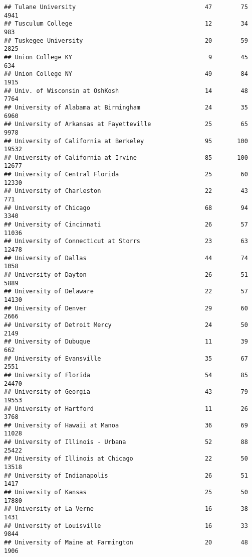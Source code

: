 \documentclass[
]{article}
\begin{document}
\begin{verbatim}
## Tulane University                                    47        75        4941
## Tusculum College                                     12        34         983
## Tuskegee University                                  20        59        2825
## Union College KY                                      9        45         634
## Union College NY                                     49        84        1915
## Univ. of Wisconsin at OshKosh                        14        48        7764
## University of Alabama at Birmingham                  24        35        6960
## University of Arkansas at Fayetteville               25        65        9978
## University of California at Berkeley                 95       100       19532
## University of California at Irvine                   85       100       12677
## University of Central Florida                        25        60       12330
## University of Charleston                             22        43         771
## University of Chicago                                68        94        3340
## University of Cincinnati                             26        57       11036
## University of Connecticut at Storrs                  23        63       12478
## University of Dallas                                 44        74        1058
## University of Dayton                                 26        51        5889
## University of Delaware                               22        57       14130
## University of Denver                                 29        60        2666
## University of Detroit Mercy                          24        50        2149
## University of Dubuque                                11        39         662
## University of Evansville                             35        67        2551
## University of Florida                                54        85       24470
## University of Georgia                                43        79       19553
## University of Hartford                               11        26        3768
## University of Hawaii at Manoa                        36        69       11028
## University of Illinois - Urbana                      52        88       25422
## University of Illinois at Chicago                    22        50       13518
## University of Indianapolis                           26        51        1417
## University of Kansas                                 25        50       17880
## University of La Verne                               16        38        1431
## University of Louisville                             16        33        9844
## University of Maine at Farmington                    20        48        1906

\end{verbatim}
\end{document}
